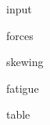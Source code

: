 \documentclass[a4paper,10pt, final, oneside, fleqn, onecolumn]{article}	%
\begin{document}
{{ input }}

{{ forces }}

{{ skewing }}

{{ fatigue }}

{{ table }}
\end{document}
